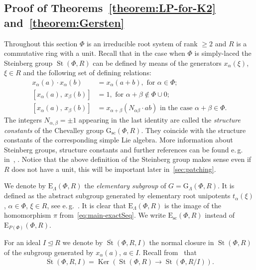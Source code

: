 \documentclass[oneside, 11pt]{amsart}
\numberwithin{equation}{section}
\newcommand{\Ker}{\mathop{\mathrm{Ker}}\nolimits}
\newcommand{\St}{\mathop{\mathrm{St}}\nolimits}
\newcommand{\E}{\mathrm{E}}
\theoremstyle{definition}
\theoremstyle{definition}
\theoremstyle{remark}
\begin{document}
\subsection{Proof of Theorems~\ref{theorem:LP-for-K2} and~\ref{theorem:Gersten}}
Throughout this section $\Phi$ is an irreducible root system of rank $\geq 2$ and $R$ is a commutative ring with a unit. Recall that in the case when $\Phi$ is simply-laced the Steinberg group $\St(\Phi, R)$ can be defined by means of the generators $x_\alpha(\xi)$, $\xi \in R$ and the following set of defining relations:
\begin{align}
x_{\alpha}(a)\cdot x_{\alpha}(b)&=x_{\alpha}(a+b),\text{ for } \alpha\in \Phi;\tag{R1} \label{R1}\\
[x_{\alpha}(a),\,x_{\beta}(b)]  &=1,\text{ for }\alpha+\beta\not\in\Phi\cup 0; \tag{R2} \label{R2} \\
[x_{\alpha}(a),\,x_{\beta}(b)]  &=x_{\alpha+\beta}(N_{\alpha\beta} \cdot ab)\text{ in the case }\alpha+\beta\in\Phi. \tag{R3} \label{R3} \end{align}
The integers $N_{\alpha,\beta} = \pm 1$ appearing in the last identity are called the {\it structure constants} of the Chevalley group $\mathrm{G}_\mathrm{sc}(\Phi, R)$. They coincide with the structure constants of the corresponding simple Lie algebra. More information about Steinberg groups, structure constants and further references can be found e.\,g. in~\cite[\S~3]{St71}, \cite[\S~2.4]{LSV20}. Notice that the above definition of the Steinberg group makes sense even if $R$ does not have a unit, this will be important later in~\cref{sec:patching}.

We denote by $\E_\Lambda(\Phi, R)$ the {\it elementary subgroup} of $G = \mathrm{G}_\Lambda(\Phi, R)$. It is defined as the abstract subgroup generated by elementary root unipotents $t_\alpha(\xi)$, $\alpha \in \Phi$, $\xi \in R$, see e.\,g.~\cite{St71, St78, VZ20, Abe83}. It is clear that $\E_\Lambda(\Phi, R)$ is the image of the homomorphism $\pi$ from~\eqref{eq:main-exactSeq}. We write $\E_\mathrm{sc}(\Phi, R)$ instead of $\E_{P(\Phi)}(\Phi, R)$.

For an ideal $I \trianglelefteq R$ we denote by $\overline{\St}(\Phi, R, I)$ the normal closure in $\St(\Phi, R)$ of the subgroup generated by $x_\alpha(a)$, $a\in I$. Recall from~\cite[Lemma~5]{S15} that
\begin{equation} \label{eq:relative-st-ker}
 \overline{\St}(\Phi, R, I) = \Ker(\St(\Phi, R) \to \St(\Phi, R/I)).
\end{equation}
\end{document}

